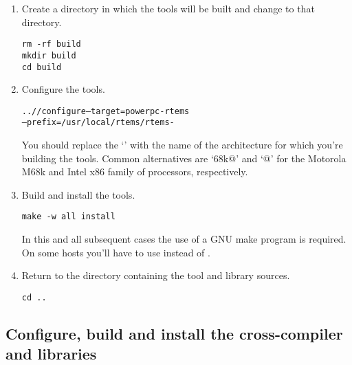 \documentclass{report}
\begin{document}
\begin{enumerate}
\item Create a directory in which the tools will be built and
change to that directory.
\begin{verbatim}
rm -rf build
mkdir build
cd build
\end{verbatim}

\item Configure the tools.
\begin{alltt}
../\BINUTILS/configure --target=powerpc-rtems\rtemsVersion \verb@\@
             --prefix=/usr/local/rtems/rtems-\rtemsVersion
\end{alltt}
You should replace the `\verb@powerpc@' with the name of the architecture
for which you're
building the tools.  Common alternatives are `\verb@m68k@' and `@' for
the Motorola M68k and Intel x86 family of processors, respectively.

\item Build and install the tools.
\begin{verbatim}
make -w all install
\end{verbatim}
In this and all subsequent cases the use of a GNU make program is required.
On some hosts you'll have to use \verb@gmake@ instead of \verb@make@.

\item Return to the directory containing the tool and library sources.
\begin{verbatim}
cd ..
\end{verbatim}
\end{enumerate}

\subsection {Configure, build and install the cross-compiler and libraries}
\end{document}
